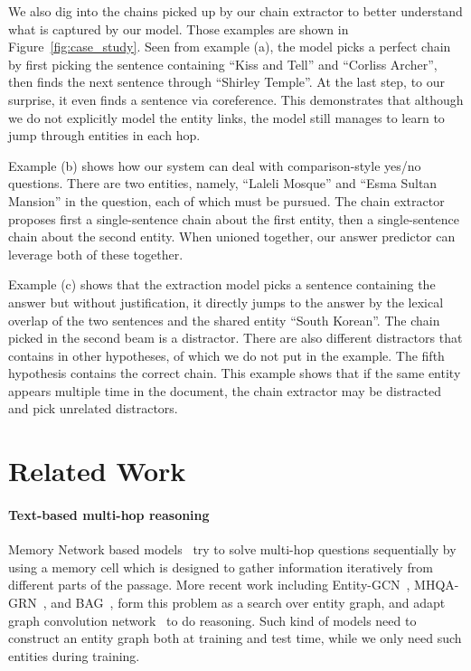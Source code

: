 \documentclass[11pt,a4paper]{article}
\begin{document}
We also dig into the chains picked up by our chain extractor to better understand what is captured by our model. Those examples are shown in Figure~\ref{fig:case_study}. Seen from example (a), the model picks a perfect chain by first picking the sentence containing ``Kiss and Tell'' and ``Corliss Archer'', then finds the next sentence through ``Shirley Temple''. At the last step, to our surprise, it even finds a sentence via coreference. This demonstrates that although we do not explicitly model the entity links, the model still manages to learn to jump through entities in each hop.

Example (b) shows how our system can deal with comparison-style yes/no questions. There are two entities, namely, ``Laleli Mosque'' and ``Esma Sultan Mansion'' in the question, each of which must be pursued. The chain extractor proposes first a single-sentence chain about the first entity, then a single-sentence chain about the second entity. When unioned together, our answer predictor can leverage both of these together.

Example (c) shows that the extraction model picks a sentence containing the answer but without justification, it directly jumps to the answer by the lexical overlap of the two sentences and the shared entity ``South Korean''. The chain picked in the second beam is a distractor. There are also different distractors that contains in other hypotheses, of which we do not put in the example. The fifth hypothesis contains the correct chain. This example shows that if the same entity appears multiple time in the document, the chain extractor may be distracted and pick unrelated distractors.









\section{Related Work}

\paragraph{Text-based multi-hop reasoning}
Memory Network based models~\citep{weston2015towards,sukhbaatar2015end,kumar2016ask,dhingra2016gated,shen2017reasonet} try to solve multi-hop questions sequentially by using a memory cell which is designed to gather information iteratively from different parts of the passage. More recent work including Entity-GCN~\citep{de2018question}, MHQA-GRN~\citep{song2018exploring}, and BAG~\citep{cao2019bag}, form this problem as a search over entity graph, and adapt graph convolution network~\cite{kipf2017semi} to do reasoning. Such kind of models need to construct an entity graph both at training and test time, while we only need such entities during training.
\end{document}
